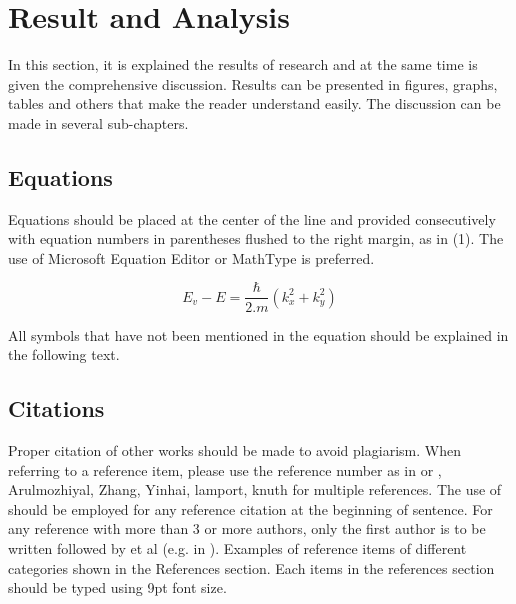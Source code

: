 \section{Result and Analysis}
\label{ResultAnalysis}
In this section, it is explained the results of research and at the same time is given the comprehensive discussion. Results can be presented in figures, graphs, tables and others that make the reader understand easily. The discussion can be made in several sub-chapters.

\subsection{Equations}
Equations should be placed at the center of the line and provided consecutively with equation numbers in parentheses flushed to the right margin, as in (1). The use of Microsoft Equation Editor or MathType is preferred.

\begin{equation}
E_v - E = \frac{\hbar}{2.m}(k_x^2 + k_y^2)
\end{equation}

All symbols that have not been mentioned in the equation should be explained in the following text.

\subsection{Citations}
Proper citation of other works should be made to avoid plagiarism. When referring to a reference item, please use the reference number as in or , Arulmozhiyal, Zhang, Yinhai, lamport, knuth for multiple references. The use of should be employed for any reference citation at the beginning of sentence. For any reference with more than 3 or more authors, only the first author is to be written followed by et al (e.g. in ).  Examples of reference items of different categories shown in the References section. Each items in the references section should be typed using 9pt font size.
